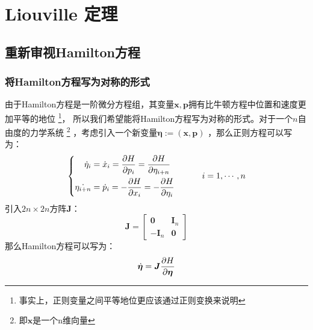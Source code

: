 \chapter{Liouville 定理}
    \section{重新审视Hamilton方程}
    \subsection{将Hamilton方程写为对称的形式}
    由于Hamilton方程是一阶微分方程组，其变量$\bm{x},\bm{p}$拥有比牛顿方程中位置和速度更加平等的地位
    \footnote{事实上，正则变量之间平等地位更应该通过正则变换\cite{Goldstein2000Classical}来说明}，
    所以我们希望能将Hamilton方程写为对称的形式。对于一个$n$自由度的力学系统
    \footnote{
        即$\bm{x}$是一个n维向量
    }
    ，考虑引入一个新变量$\bm{\eta}:= (\bm{x}, \bm{p})$
    ，那么正则方程可以写为：
    \begin{equation}
        \left\{
        \begin{split}
            \dot{\eta}_{i} &= \dot{x}_i = \frac{\partial{H}}{\partial{p_i}} = \frac{\partial{H}}{\partial{\eta_{i+n}}}\\
            \dot{\eta_{i+n}} &= \dot{p}_i = - \frac{\partial{H}}{\partial{x_i}} = -\frac{\partial{H}}{\partial{\eta_{i}}}
        \end{split}
        \right.
        \quad\quad\quad i = 1,\cdots, n
    \end{equation}
    引入$2n\times 2n$方阵$\bm{J}$：
    \begin{equation}
        \bm{J} = 
        \begin{bmatrix}
            \bm{0} & \bm{I}_n\\
            -\bm{I}_n & \bm{0}
        \end{bmatrix}
    \end{equation}
    那么Hamilton方程可以写为：
    \begin{equation}
        \dot{\bm{\eta}} = \bm{J}\frac{\partial{H}}{\partial{\bm{\eta}}}
        \label{canonical equation}
    \end{equation}

